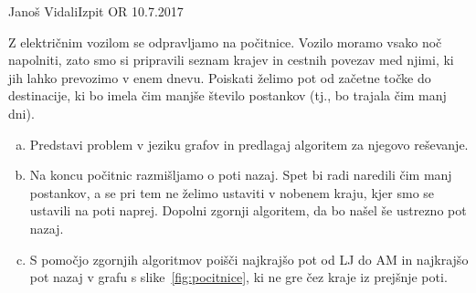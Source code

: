 \begin{naloga}{Janoš Vidali}{Izpit OR 10.7.2017}
\begin{vprasanje}
Z električnim vozilom se odpravljamo na počitnice.
Vozilo moramo vsako noč napolniti,
zato smo si pripravili seznam krajev in cestnih povezav med njimi,
ki jih lahko prevozimo v enem dnevu.
Poiskati želimo pot od začetne točke do destinacije,
ki bo imela čim manjše število postankov (tj., bo trajala čim manj dni).

\begin{enumerate}[(a)]
\item Predstavi problem v jeziku grafov
in predlagaj algoritem za njegovo reševanje.

\item Na koncu počitnic razmišljamo o poti nazaj.
Spet bi radi naredili čim manj postankov,
a se pri tem ne želimo ustaviti v nobenem kraju,
kjer smo se ustavili na poti naprej.
Dopolni zgornji algoritem, da bo našel še ustrezno pot nazaj.

\item S pomočjo zgornjih algoritmov poišči najkrajšo pot od LJ do AM
in najkrajšo pot nazaj v grafu s slike~\ref{fig:pocitnice},
ki ne gre čez kraje iz prejšnje poti.
\end{enumerate}

\begin{figure}
\centering
{}
\end{figure}
\end{vprasanje}
\end{naloga}
